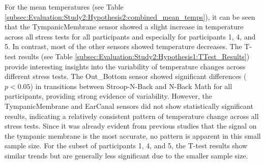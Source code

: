 For the mean temperatures (see Table \ref{subsec:Evaluation:Study2:Hypothesis2:combined_mean_temps}), it can be seen that the TympanicMembrane sensor showed a slight increase in temperature across all stress tests for all participants and especially for participants 1, 4, and 5. In contrast, most of the other sensors showed temperature decreases.
The T-test results (see Table \ref{subsec:Evaluation:Study2:Hypothesis1:TTest_Results}) provide interesting insights into the variability of temperature changes across different stress tests. 
The Out\_Bottom sensor showed significant differences ($p<0.05$) in transitions between Stroop-N-Back and N-Back Math for all participants, providing strong evidence of variability. 
However, the TympanicMembrane and EarCanal sensors did not show statistically significant results, indicating a relatively consistent pattern of temperature change across all stress tests.
Since it was already evident from previous studies that the signal on the tympanic membrane is the most accurate, no pattern is apparent in this small sample size.
For the subset of participants 1, 4, and 5, the T-test results show similar trends but are generally less significant due to the smaller sample size.

